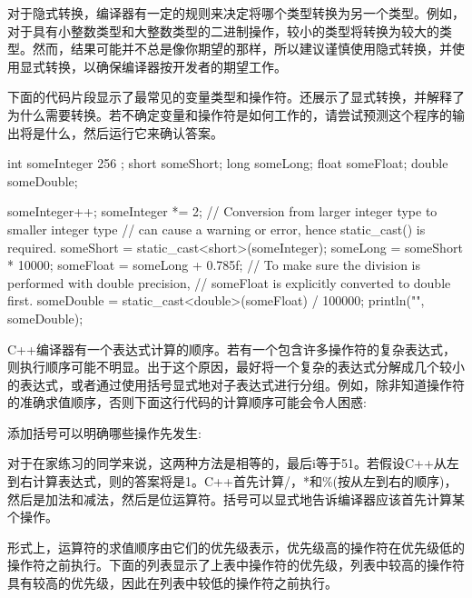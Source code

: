 对于隐式转换，编译器有一定的规则来决定将哪个类型转换为另一个类型。例如，对于具有小整数类型和大整数类型的二进制操作，较小的类型将转换为较大的类型。然而，结果可能并不总是像你期望的那样，所以建议谨慎使用隐式转换，并使用显式转换，以确保编译器按开发者的期望工作。

下面的代码片段显示了最常见的变量类型和操作符。还展示了显式转换，并解释了为什么需要转换。若不确定变量和操作符是如何工作的，请尝试预测这个程序的输出将是什么，然后运行它来确认答案。

\begin{cpp}
int someInteger { 256 };
short someShort;
long someLong;
float someFloat;
double someDouble;

someInteger++;
someInteger *= 2;
// Conversion from larger integer type to smaller integer type
// can cause a warning or error, hence static_cast() is required.
someShort = static_cast<short>(someInteger);
someLong = someShort * 10000;
someFloat = someLong + 0.785f;
// To make sure the division is performed with double precision,
// someFloat is explicitly converted to double first.
someDouble = static_cast<double>(someFloat) / 100000;
println("{}", someDouble);
\end{cpp}

C++编译器有一个表达式计算的顺序。若有一个包含许多操作符的复杂表达式，则执行顺序可能不明显。出于这个原因，最好将一个复杂的表达式分解成几个较小的表达式，或者通过使用括号显式地对子表达式进行分组。例如，除非知道操作符的准确求值顺序，否则下面这行代码的计算顺序可能会令人困惑:


添加括号可以明确哪些操作先发生:


对于在家练习的同学来说，这两种方法是相等的，最后i等于51。若假设C++从左到右计算表达式，则的答案将是1。C++首先计算/，*和\%(按从左到右的顺序)，然后是加法和减法，然后是位运算符。括号可以显式地告诉编译器应该首先计算某个操作。

形式上，运算符的求值顺序由它们的优先级表示，优先级高的操作符在优先级低的操作符之前执行。下面的列表显示了上表中操作符的优先级，列表中较高的操作符具有较高的优先级，因此在列表中较低的操作符之前执行。

